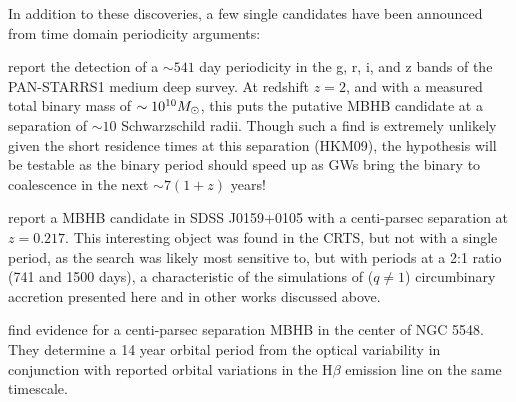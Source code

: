 In addition to these discoveries, a few single candidates have been announced
from time domain periodicity arguments: 

\cite{Liu:7pc:2015} report the detection of a $\sim 541$ day periodicity in
the g, r, i, and z bands of the PAN-STARRS1 medium deep survey. At redshift
$z=2$, and with a measured total binary mass of $\sim 10^{10} {M_{\odot}}$, this
puts the putative MBHB candidate at a separation of $\sim10$ Schwarzschild
radii. Though such a find is extremely unlikely given the short residence
times at this separation (HKM09), the hypothesis will be testable as the binary
period should speed up as GWs bring the binary to coalescence in the next
$\sim 7 (1+z)$ years!


\cite{Zheng:MBHB_2P:2015} report a MBHB candidate in SDSS J0159+0105 with a
centi-parsec separation at $z=0.217$. This interesting object was found in the
CRTS, but not with a single period, as the \cite{Graham+2015b} search was
likely most sensitive to, but with periods at a 2:1 ratio (741 and 1500
days), a characteristic of the simulations of ($q \neq 1$) circumbinary
accretion presented here and in other works discussed above.


\cite{LiWang:2016} find evidence for a centi-parsec separation MBHB in the
center of NGC 5548. They determine a 14 year orbital period from the optical
variability in conjunction with reported orbital variations in the H$\beta$
emission line on the same timescale.



